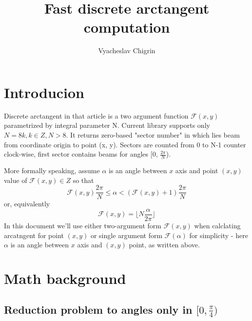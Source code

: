 \documentclass{article}
\begin{document}
\title{Fast discrete arctangent computation}
\author{Vyacheslav Chigrin}
\maketitle

\section{Introducion}
Discrete arctangent in that article is a two argument function $\mathcal{F}(x, y)$ parametrized by
integral parameter N. Current library supports only $N = 8k, k \in Z, N > 8$.
It returns zero-based "sector number" in which lies beam from coordinate origin to
point (x, y). Sectors are counted from 0 to N-1 counter clock-wise,
first sector contains beams for angles  [0, $\frac{2\pi}{N}$).

More formally speaking, assume $\alpha$ is an angle between $x$ axis and
point $(x, y)$ value of $\mathcal{F}(x, y) \in Z$ so that
\begin{equation}
\label{eq:F_def}
\mathcal{F}(x, y)\frac{2\pi}{N} \leq \alpha < (\mathcal{F}(x, y) + 1)\frac{2\pi}{N}
\end{equation}
or, equivalently
$$
\label{eq:F_def_floor}
\mathcal{F}(x, y) = \lfloor N \frac{\alpha}{2\pi} \rfloor
$$
In this document we'll use either two-argument form $\mathcal{F}(x, y)$ when
calclating arcatngent for point $(x, y)$ or single argument form
$\mathcal{F}(\alpha)$ for simplicity - here $\alpha$ is an angle between $x$ axis
and $(x,y)$ point, as written above.

\section{Math background}
\subsection{Reduction problem to angles only in $[0, \frac{\pi}{4})$}
\end{document}

